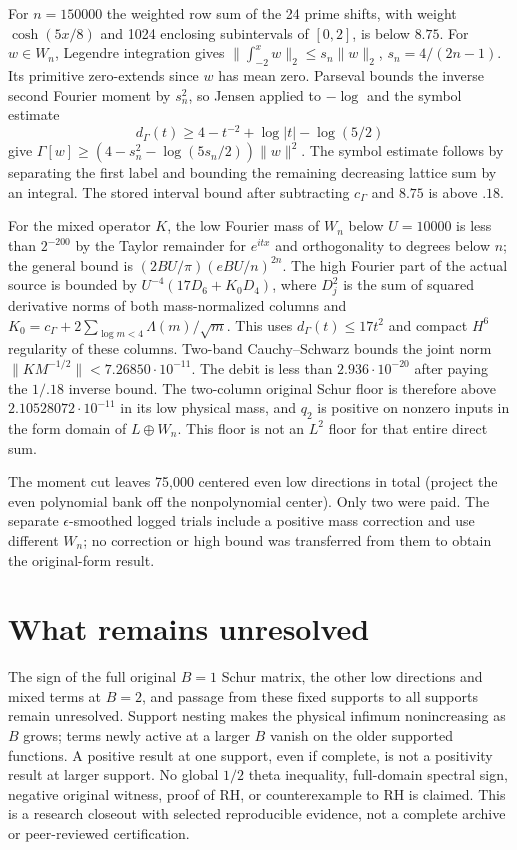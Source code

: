 \documentclass[11pt]{article}
\begin{document}
For $n=150000$ the weighted row sum of the 24 prime shifts, with weight $\cosh(5x/8)$ and 1024 enclosing subintervals of $[0,2]$, is below $8.75$. For $w\in W_n$, Legendre integration gives $\|\int_{-2}^{x}w\|_2\le s_n\|w\|_2$, $s_n=4/(2n-1)$. Its primitive zero-extends since $w$ has mean zero. Parseval bounds the inverse second Fourier moment by $s_n^2$, so Jensen applied to $-\log$ and the symbol estimate
\[
 d_\Gamma(t)\ge4-t^{-2}+\log|t|-\log(5/2)
\]
give $\Gamma[w]\ge(4-s_n^2-\log(5s_n/2))\|w\|^2$. The symbol estimate follows by separating the first label and bounding the remaining decreasing lattice sum by an integral. The stored interval bound after subtracting $c_\Gamma$ and $8.75$ is above $.18$.

For the mixed operator $K$, the low Fourier mass of $W_n$ below $U=10000$ is less than $2^{-200}$ by the Taylor remainder for $e^{itx}$ and orthogonality to degrees below $n$; the general bound is $(2BU/\pi)(eBU/n)^{2n}$. The high Fourier part of the actual source is bounded by $U^{-4}(17D_6+K_0 D_4)$, where $D_j^2$ is the sum of squared derivative norms of both mass-normalized columns and $K_0=c_\Gamma+2\sum_{\log m<4}\Lambda(m)/\sqrt m$. This uses $d_\Gamma(t)\le17t^2$ and compact $H^6$ regularity of these columns. Two-band Cauchy--Schwarz bounds the joint norm $\|KM^{-1/2}\|<7.26850\cdot10^{-11}$. The debit is less than $2.936\cdot10^{-20}$ after paying the $1/.18$ inverse bound. The two-column original Schur floor is therefore above $2.10528072\cdot10^{-11}$ in its low physical mass, and $q_2$ is positive on nonzero inputs in the form domain of $L\oplus W_n$. This floor is not an $L^2$ floor for that entire direct sum.

The moment cut leaves 75,000 centered even low directions in total (project the even polynomial bank off the nonpolynomial center). Only two were paid. The separate $\epsilon$-smoothed logged trials include a positive mass correction and use different $W_n$; no correction or high bound was transferred from them to obtain the original-form result.

\section{What remains unresolved}
The sign of the full original $B=1$ Schur matrix, the other low directions and mixed terms at $B=2$, and passage from these fixed supports to all supports remain unresolved. Support nesting makes the physical infimum nonincreasing as $B$ grows; terms newly active at a larger $B$ vanish on the older supported functions. A positive result at one support, even if complete, is not a positivity result at larger support. No global $1/2$ theta inequality, full-domain spectral sign, negative original witness, proof of RH, or counterexample to RH is claimed. This is a research closeout with selected reproducible evidence, not a complete archive or peer-reviewed certification.
\end{document}

